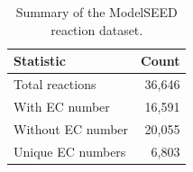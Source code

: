 \begin{table}[h]
\centering
\caption{Summary of the ModelSEED reaction dataset.}
\label{tab:dataset_summary}
\begin{tabular}{lr}
\toprule
\textbf{Statistic} & \textbf{Count} \\
\midrule
Total reactions       & 36,646 \\
With EC number        & 16,591 \\
Without EC number     & 20,055 \\
Unique EC numbers     & 6,803  \\
\bottomrule
\end{tabular}
\end{table}
